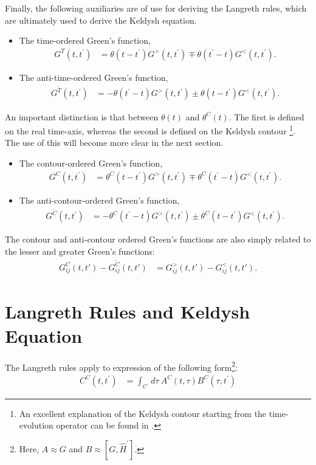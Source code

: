 Finally, the following auxiliaries are of use for deriving the Langreth rules, which are ultimately used to derive the Keldysh equation.
\begin{itemize}
\item The time-ordered Green's function, \begin{align*}
G^T(t,t^\prime) &= \theta(t-t^\prime) G^>(t,t^\prime)  \mp \theta(t^\prime-t)G^<(t,t^\prime) .
\end{align*}
\item The anti-time-ordered Green's function, \begin{align*}
G^{\tilde{T}}(t,t^\prime) &= - \theta(t^\prime-t) G^>(t,t^\prime)  \pm \theta(t-t^\prime)G^<(t,t^\prime) .
\end{align*} 
\end{itemize}

An important distinction is that between $\theta (t)$ and $\theta^C(t)$. The first is defined on the real time-axis, whereas the second is defined on the Keldysh contour \footnote{An excellent explanation of the Keldysh contour starting from the time-evolution operator can be found in \citet{diventra}.}. The use of this will become more clear in the next section. 
\begin{itemize}
\item The contour-ordered Green's function, \begin{align*}
G^C(t,t^\prime) &= \theta^C(t-t^\prime) G^>(t,t^\prime)  \mp \theta^C(t^\prime-t)G^<(t,t^\prime) .
\end{align*}
\item The anti-contour-ordered Green's function, \begin{align*}
G^{\tilde{C}}(t,t^\prime) &= - \theta^C(t^\prime-t) G^>(t,t^\prime)  \pm \theta^C(t-t^\prime)G^<(t,t^\prime).
\end{align*} 
\end{itemize}


The contour and anti-contour ordered Green's functions are also simply related to the lesser and greater Green's functions:
\begin{align*}
G^C_{ij}(t,t') - G^{\tilde{C}}_{ij}(t,t') &= G^>_{ij}(t,t') - G^<_{ij}(t,t').
\end{align*}

\section{Langreth Rules and Keldysh Equation}
The Langreth rules apply to expression of the following form\footnote{Here, $A \approx G$ and $B \approx [G, \widehat{H}^\prime]$.}:
\begin{align*}
C^C(t,t^\prime) &= \int_C\:d\tau\:A^C(t,\tau) B^C (\tau, t^\prime)
\end{align*}

